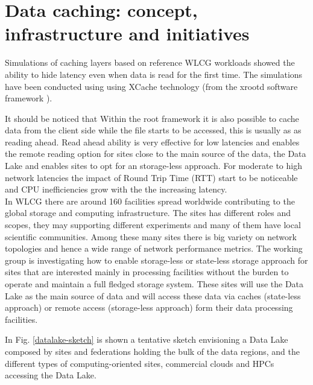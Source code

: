 \section{Data caching: concept, infrastructure and initiatives}
Simulations of caching layers based on reference WLCG workloads showed the ability to hide latency even when data is read for the first time. The simulations have been conducted using using XCache technology (from the xrootd software framework \cite{xroot}).

It should be noticed that Within the root framework \cite{root} it is also possible to cache data from the client side while the file starts to be accessed, this is usually as as reading ahead. Read ahead ability is very effective for low latencies and enables the remote reading option for sites close to the main source of the data, the Data Lake and enables sites to opt for an storage-less approach. For moderate to high network latencies the impact of Round Trip Time (RTT) start to be noticeable and CPU inefficiencies grow with the the increasing latency.\\
In WLCG there are around 160 facilities spread worldwide contributing to the global storage and computing infrastructure. The sites has different roles and scopes, they may supporting different experiments and many of them have local scientific communities. Among these many sites there is big variety on network topologies and hence a wide range of network performance metrics. The working group is investigating how to enable storage-less or state-less storage approach for sites that are interested mainly in processing facilities without the burden to operate and maintain a full fledged storage system. These sites will use the Data Lake as the main source of data and will access these data via caches (state-less approach) or remote access (storage-less approach) form their data processing facilities.

In Fig. \ref{datalake-sketch} is shown a tentative 
sketch envisioning a Data Lake composed by sites and federations holding the bulk of the data regions, and 
the different types of computing-oriented sites, commercial clouds and HPCs accessing the Data Lake.\\

